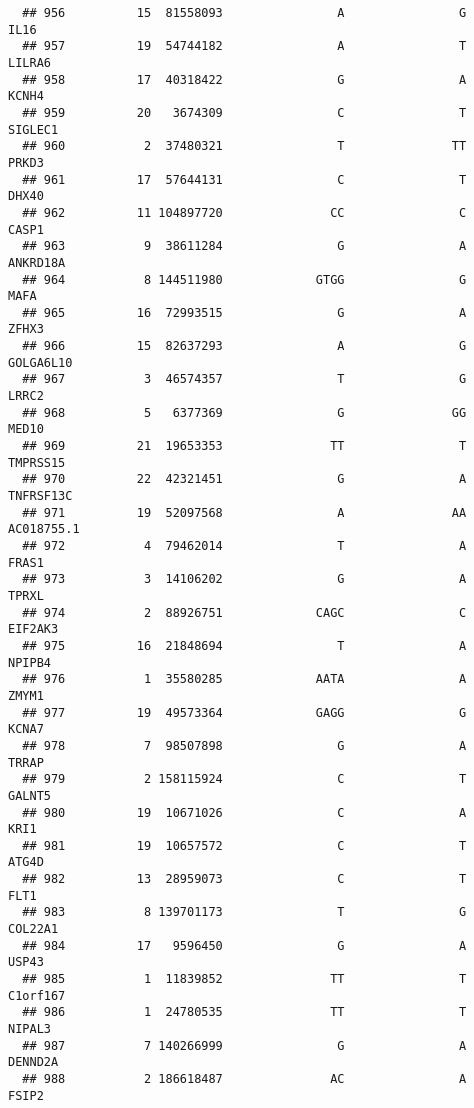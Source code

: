 \documentclass[12pt,twoside]{reedthesis}
\theoremstyle{definition}
\theoremstyle{definition}
\theoremstyle{remark}
\begin{document}
\begin{verbatim}
  ## 956          15  81558093                A                G           IL16
  ## 957          19  54744182                A                T         LILRA6
  ## 958          17  40318422                G                A          KCNH4
  ## 959          20   3674309                C                T        SIGLEC1
  ## 960           2  37480321                T               TT          PRKD3
  ## 961          17  57644131                C                T          DHX40
  ## 962          11 104897720               CC                C          CASP1
  ## 963           9  38611284                G                A       ANKRD18A
  ## 964           8 144511980             GTGG                G           MAFA
  ## 965          16  72993515                G                A          ZFHX3
  ## 966          15  82637293                A                G      GOLGA6L10
  ## 967           3  46574357                T                G          LRRC2
  ## 968           5   6377369                G               GG          MED10
  ## 969          21  19653353               TT                T       TMPRSS15
  ## 970          22  42321451                G                A      TNFRSF13C
  ## 971          19  52097568                A               AA     AC018755.1
  ## 972           4  79462014                T                A          FRAS1
  ## 973           3  14106202                G                A          TPRXL
  ## 974           2  88926751             CAGC                C        EIF2AK3
  ## 975          16  21848694                T                A         NPIPB4
  ## 976           1  35580285             AATA                A          ZMYM1
  ## 977          19  49573364             GAGG                G          KCNA7
  ## 978           7  98507898                G                A          TRRAP
  ## 979           2 158115924                C                T         GALNT5
  ## 980          19  10671026                C                A           KRI1
  ## 981          19  10657572                C                T          ATG4D
  ## 982          13  28959073                C                T           FLT1
  ## 983           8 139701173                T                G        COL22A1
  ## 984          17   9596450                G                A          USP43
  ## 985           1  11839852               TT                T       C1orf167
  ## 986           1  24780535               TT                T         NIPAL3
  ## 987           7 140266999                G                A        DENND2A
  ## 988           2 186618487               AC                A          FSIP2

\end{verbatim}
\end{document}
